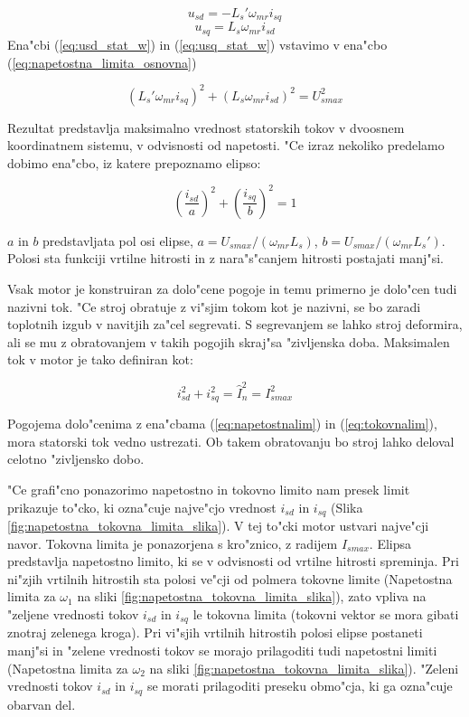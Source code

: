 \documentclass[journal,a4paper,twoside]{sty/IEEEtran}
\begin{document}
\begin{equation}
u_{sd}= - L_s' \omega_{mr} i_{sq}
\label{eq:usd_stat_w}
\end{equation}
\begin{equation}
u_{sq}=  L_s \omega_{mr}i_{sd}
\label{eq:usq_stat_w}
\end{equation}
 Ena"cbi (\ref{eq:usd_stat_w}) in (\ref{eq:usq_stat_w}) vstavimo v ena"cbo (\ref{eq:napetostna_limita_osnovna})

\begin{equation}
(L_s' \omega_{mr} i_{sq})^2+(L_s \omega_{mr}i_{sd})^2= U_{smax}^2
\label{eq:napetostnalim1}
\end{equation}

Rezultat predstavlja maksimalno vrednost statorskih tokov v dvoosnem koordinatnem sistemu, v odvisnosti od napetosti. "Ce izraz nekoliko predelamo dobimo ena"cbo, iz katere prepoznamo elipso: 

\begin{equation}
(\frac{i_{sd}}{a})^2+(\frac{i_{sq}}{b})^2 = 1
\label{eq:napetostnalim}
\end{equation}

$a$ in $b$ predstavljata pol osi elipse, $a=U_{smax}/(\omega_{mr}L_s)$, $b=U_{smax}/(\omega_{mr}L_s')$. Polosi sta funkciji vrtilne hitrosti in z nara"s"canjem hitrosti postajati manj"si.

Vsak motor je konstruiran za dolo"cene pogoje in temu primerno je dolo"cen tudi nazivni tok. "Ce stroj obratuje z vi"sjim tokom kot je nazivni, se bo zaradi toplotnih izgub v navitjih za"cel segrevati. S segrevanjem se lahko stroj deformira, ali se mu z obratovanjem v takih pogojih skraj"sa "zivljenska doba. Maksimalen tok v motor je tako definiran kot:

\begin{equation}
i_{sd}^2+i_{sq}^2=\hat{I}_{n}^2=I_{smax}^2
\label{eq:tokovnalim}
\end{equation}

Pogojema dolo"cenima z ena"cbama (\ref{eq:napetostnalim}) in (\ref{eq:tokovnalim}), mora statorski tok vedno ustrezati. Ob takem obratovanju bo stroj lahko deloval celotno "zivljensko dobo.\cite{vas}

"Ce grafi"cno ponazorimo napetostno in tokovno limito nam presek limit prikazuje to"cko, ki ozna"cuje najve"cjo vrednost $i_{sd}$ in $i_{sq}$ (Slika \ref{fig:napetostna_tokovna_limita_slika}). V tej to"cki motor ustvari najve"cji navor. Tokovna limita je ponazorjena s kro"znico, z radijem $I_{smax}$. Elipsa predstavlja napetostno limito, ki se v odvisnosti od vrtilne hitrosti spreminja. Pri ni"zjih vrtilnih hitrostih sta polosi ve"cji od polmera tokovne limite (Napetostna limita za $\omega_1$ na sliki \ref{fig:napetostna_tokovna_limita_slika}), zato vpliva na "zeljene vrednosti tokov $i_{sd}$ in $i_{sq}$ le tokovna limita (tokovni vektor se mora gibati znotraj zelenega kroga). Pri vi"sjih vrtilnih hitrostih polosi elipse postaneti manj"si in "zelene vrednosti tokov se morajo prilagoditi tudi napetostni limiti (Napetostna limita za $\omega_2$ na sliki \ref{fig:napetostna_tokovna_limita_slika}). "Zeleni vrednosti tokov $i_{sd}$ in $i_{sq}$ se morati prilagoditi preseku obmo"cja, ki ga ozna"cuje obarvan del.
\end{document}
